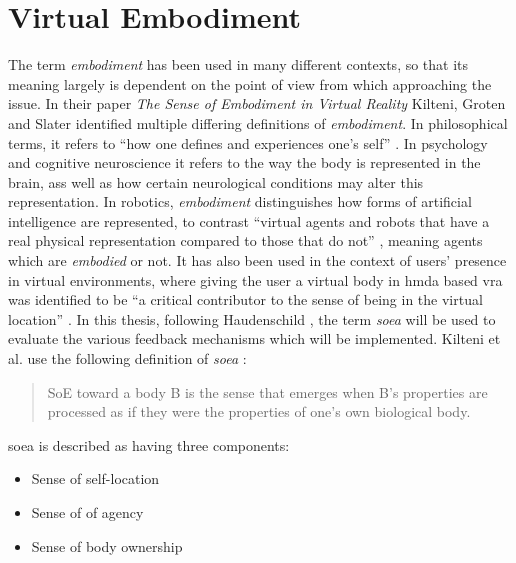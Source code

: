 
\chapter{Virtual Embodiment}\label{chapter:VirtualEmbodiment}

The term \textit{embodiment} has been used in many different contexts, so that its meaning largely is dependent on the point of view from which approaching the issue. 
\newline
In their paper \textit{The Sense of Embodiment in Virtual Reality} \autocite{senseEmbodimentVR} Kilteni, Groten and Slater identified multiple differing definitions of \textit{embodiment}.
In philosophical terms, it refers to \enquote{how one defines and experiences one’s self} \autocite[p. ~2]{senseEmbodimentVR}. In psychology and cognitive neuroscience it refers to the way the body is represented in the brain, ass well as how certain neurological conditions may alter this representation. In robotics, \textit{embodiment} distinguishes how forms of artificial intelligence are represented, to contrast \enquote{virtual agents and robots that have a real physical representation compared to those that do not} \autocite[p. ~2]{senseEmbodimentVR}, meaning agents which are \textit{embodied} or not. It has also been used in the context of users' presence in virtual environments, where giving the user a virtual body in \gls{hmda} based \gls{vra} was identified to be \enquote{a critical contributor to the
sense of being in the virtual location} \autocite[p. ~2]{senseEmbodimentVR}.
\newline
In this thesis, following Haudenschild \autocite{JohnnyVEThesis}, the term \textit{\gls{soea}} will be used to evaluate the various feedback mechanisms which will be implemented. Kilteni et al. use the following definition of \textit{\gls{soea}} \autocite[p. ~2-3]{senseEmbodimentVR}:
\begin{quote}
    SoE toward a body B is the sense that emerges when B’s properties are processed as if they were the properties of one’s own biological body.
\end{quote}
\Gls{soea} is described as having three components:
\begin{itemize}
    \item Sense of self-location
    \item Sense of of agency
    \item Sense of body ownership
\end{itemize}

